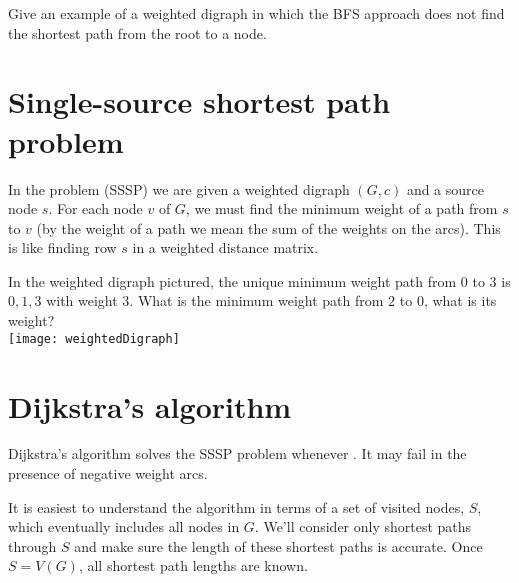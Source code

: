 
\begin{Boxample}[2]
Give an example of a weighted digraph in which the BFS approach
does not find the shortest path from the root to a node.
\end{Boxample}


\section{Single-source shortest path problem}
\label{sec:SSSP}

In  the  problem (SSSP) we are given a weighted digraph $(G, c)$ and a source node
$s$. 
For each node $v$ of $G$, we must find the minimum weight of a path
from $s$ to $v$ (by the weight of a path we mean the sum of the weights
on the arcs). This is like  finding row $s$ in a weighted distance matrix.

\begin{Boxample} \label{eg:SSSP}
In the weighted digraph pictured, the unique minimum weight path from $0$ to $3$ is $0, 1, 3$ with weight $3$.
What is the minimum weight path from $2$ to $0$, what is its weight?\\

\texttt{[image: weightedDigraph]}
\end{Boxample}

\section{Dijkstra's algorithm}
Dijkstra's algorithm solves the SSSP problem whenever . It may fail in the presence of negative weight arcs.


It is easiest to understand the algorithm in terms of a set of visited nodes, $S$, which eventually includes all nodes in $G$. We'll consider only shortest paths through $S$ and make sure the length of these shortest paths is accurate. Once $S = V(G)$, all shortest path lengths are known. 

